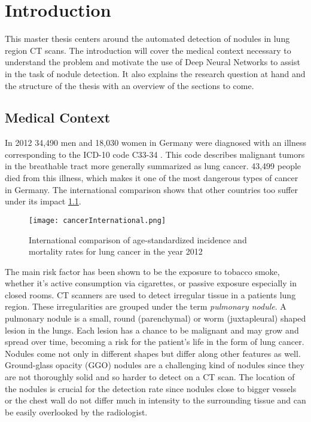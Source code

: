 \documentclass[main.tex]{subfiles}
\begin{document}
\chapter{Introduction}
This master thesis centers around the automated detection of nodules in lung region CT scans. The introduction will cover the medical context necessary to understand the problem and motivate the use of Deep Neural Networks to assist in the task of nodule detection. It also explains the research question at hand and the structure of the thesis with an overview of the sections to come.

\section{Medical Context}
In 2012 34,490 men and 18,030 women in Germany were diagnosed with an illness corresponding to the ICD-10 code C33-34 \cite{koch2015krebs}. This code describes malignant tumors in the breathable tract more generally summarized as lung cancer. 43,499 people died from this illness, which makes it one of the most dangerous types of cancer in Germany. The international comparison shows that other countries too suffer under its impact \ref{fig:cancInt}.

\begin{figure}[ht]
\texttt{[image: cancerInternational.png]}
\caption{International comparison of age-standardized incidence and mortality rates for lung cancer in the year 2012}
\label{fig:cancInt}
\end{figure}

The main risk factor has been shown to be the exposure to tobacco smoke, whether it's active consumption via cigarettes, or passive exposure especially in closed rooms. CT scanners are used to detect irregular tissue in a patients lung region. These irregularities are grouped under the term \textit{pulmonary nodule}. A pulmonary nodule is a small, round (parenchymal) or worm (juxtapleural) shaped lesion in the lungs. Each lesion has a chance to be malignant and may grow and spread over time, becoming a risk for the patient's life in the form of lung cancer. Nodules come not only in different shapes but differ along other features as well. Ground-glass opacity (GGO) nodules are a challenging kind of nodules since they are not thoroughly solid and so harder to detect on a CT scan. The location of the nodules is crucial for the detection rate since nodules close to bigger vessels or the chest wall do not differ much in intensity to the surrounding tissue and can be easily overlooked by the radiologist.
\end{document}

